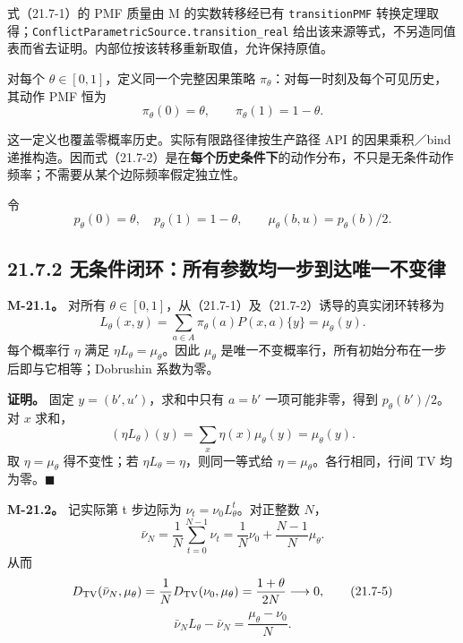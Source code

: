 \documentclass[
  11pt,
  oneside]{book}
\begin{document}
式（21.7-1）的 PMF 质量由 M 的实数转移经已有 \nolinkurl{transitionPMF} 转换定理取得；\nolinkurl{ConflictParametricSource.transition_real} 给出该来源等式，不另造同值表而省去证明。内部位按该转移重新取值，允许保持原值。

对每个 \(\theta\in[0,1]\)，定义同一个完整因果策略 \(\pi_\theta\)：对每一时刻及每个可见历史，其动作 PMF 恒为 \[\pi_\theta(0)=\theta,\qquad \pi_\theta(1)=1-\theta.     \tag{21.7-2}\]

这一定义也覆盖零概率历史。实际有限路径律按生产路径 API 的因果乘积／bind 递推构造。因而式（21.7-2）是在\textbf{每个历史条件下}的动作分布，不只是无条件动作频率；不需要从某个边际频率假定独立性。

令 \[p_\theta(0)=\theta,\quad p_\theta(1)=1-\theta,\qquad
\mu_\theta(b,u)=p_\theta(b)/2.\]

\subsection{21.7.2 无条件闭环：所有参数均一步到达唯一不变律}\label{ux65e0ux6761ux4ef6ux95edux73afux6240ux6709ux53c2ux6570ux5747ux4e00ux6b65ux5230ux8fbeux552fux4e00ux4e0dux53d8ux5f8b}

\hypertarget{m-21-1}{}\label{m-21-1}

\textbf{M-21.1。} 对所有 \(\theta\in[0,1]\)，从（21.7-1）及（21.7-2）诱导的真实闭环转移为 \[L_\theta(x,y)
=\sum_{a\in A}\pi_\theta(a)P(x,a)\{y\}
=\mu_\theta(y).                                      \tag{21.7-3}\] 每个概率行 \(\eta\) 满足 \(\eta L_\theta=\mu_\theta\)。因此 \(\mu_\theta\) 是唯一不变概率行，所有初始分布在一步后即与它相等；Dobrushin 系数为零。

\textbf{证明。} 固定 \(y=(b',u')\)，求和中只有 \(a=b'\) 一项可能非零，得到 \(p_\theta(b')/2\)。对 \(x\) 求和， \[(\eta L_\theta)(y)=\sum_x\eta(x)\mu_\theta(y)=\mu_\theta(y).\] 取 \(\eta=\mu_\theta\) 得不变性；若 \(\eta L_\theta=\eta\)，则同一等式给 \(\eta=\mu_\theta\)。各行相同，行间 TV 均为零。\(\blacksquare\)

\hypertarget{m-21-2}{}\label{m-21-2}

\textbf{M-21.2。} 记实际第 t 步边际为 \(\nu_t=\nu_0L_\theta^t\)。对正整数 \(N\)， \[\bar\nu_N=\frac1N\sum_{t=0}^{N-1}\nu_t
=\frac1N\nu_0+\frac{N-1}{N}\mu_\theta.                \tag{21.7-4}\] 从而 \[D_{\rm TV}(\bar\nu_N,\mu_\theta)
=\frac1N D_{\rm TV}(\nu_0,\mu_\theta)
=\frac{1+\theta}{2N}\longrightarrow0,                \tag{21.7-5}\] \[\bar\nu_NL_\theta-\bar\nu_N
=\frac{\mu_\theta-\nu_0}{N}.                         \tag{21.7-6}\]
\end{document}
